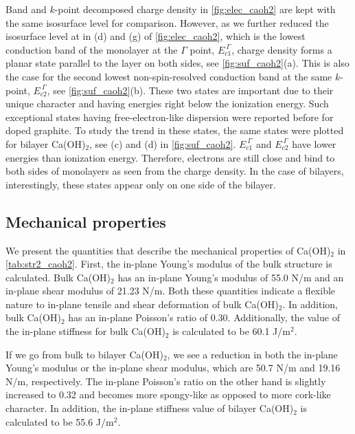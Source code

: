Band and $k$-point decomposed charge density in \autoref{fig:elec_caoh2} are 
kept with the same isosurface level for comparison. However, as we further 
reduced the isosurface level at  in (d) and (g) of \autoref{fig:elec_caoh2}, which is the lowest conduction band of the 
monolayer at the $\Gamma$ point, $E_{c1}^{~\Gamma}$, charge density forms a planar 
state parallel to the layer on both sides, see \autoref{fig:suf_caoh2}(a). This
is also the case for the second lowest non-spin-resolved conduction band at the same
$k$-point, $E_{c2}^{~\Gamma}$, see \autoref{fig:suf_caoh2}(b). These two states are 
important due to their unique character and having energies right below the ionization energy. Such exceptional states 
having free-electron-like dispersion were reported before\cite{Posternak1,Posternak2} for 
doped graphite. To study the trend in these states, the same states were plotted 
for bilayer Ca(OH)$_2$, see (c) and (d) in \autoref{fig:suf_caoh2}. $E_{c1}^{~\Gamma}$ and $E_{c2}^{~\Gamma}$ have lower energies than ionization energy. Therefore, electrons are still close and bind to both sides of monolayers as seen from the charge density. In the case of bilayers, interestingly, these states appear only on one side of the bilayer.

\subsection{Mechanical properties}

We present the quantities that describe the mechanical 
properties of Ca(OH)$_2$ in \autoref{tab:str2_caoh2}. 
First, the in-plane Young's modulus of the bulk structure is calculated. 
Bulk Ca(OH)$_2$ has an in-plane Young's modulus of 55.0 N/m and an in-plane shear 
modulus of 21.23 N/m. Both these quantities indicate a flexible nature to in-plane 
tensile and shear deformation of bulk Ca(OH)$_2$. In addition, bulk Ca(OH)$_2$ has 
an in-plane Poisson's ratio of 0.30.  Additionally, the value of the in-plane 
stiffness for bulk Ca(OH)$_{2}$ is calculated to be 60.1 J/m$^{2}$. 

If we go from bulk to bilayer Ca(OH)$_2$, we see a reduction in both the
in-plane Young's modulus or the in-plane shear modulus, which are 50.7 N/m and 
19.16 N/m, respectively. The in-plane Poisson's ratio on the other hand is 
slightly increased to 0.32 and becomes more spongy-like as opposed to more 
cork-like character\cite{poisson}. In addition, the in-plane stiffness value of 
bilayer Ca(OH)$_{2}$ is calculated to be 55.6 J$/$m$^{2}$. 

